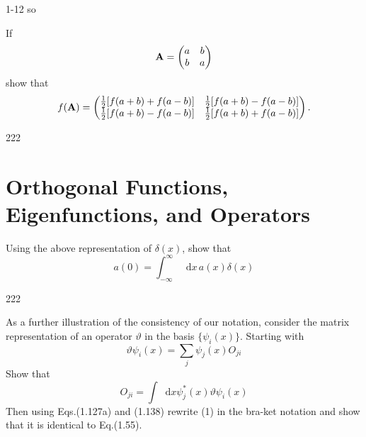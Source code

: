 \documentclass[a4paper]{book}
\newcommand*{\dif}{\mathop{}\!\mathrm{d}}
\newcommand{\A}{{\bf A}}
\begin{document}
	\begin{solution}
		1-12 so
	\end{solution}

	\begin{exercise}
	If
	\begin{equation*}
		\A = \begin{pmatrix} a & b \\ b & a \end{pmatrix}			
	\end{equation*}
	show that
	\begin{equation*}
		f(\A) = \begin{pmatrix}
		\frac{1}{2}[f(a+b)+f(a-b)] & \frac{1}{2}[f(a+b)-f(a-b)] \\
		\frac{1}{2}[f(a+b)-f(a-b)] & \frac{1}{2}[f(a+b)+f(a-b)]
		\end{pmatrix}.
	\end{equation*}
	\end{exercise}
	
	\begin{solution}
		222
	\end{solution}
	
	\section{Orthogonal Functions, Eigenfunctions, and Operators}
	
	\begin{exercise}
	Using the above representation of $\delta(x)$, show that
	\begin{equation*}
		a(0) = \int_{-\infty}^\infty \dif x \, a(x) \delta(x)
	\end{equation*}
	\end{exercise}
	
	\begin{solution}
		222
	\end{solution}

	\begin{exercise}
	As a further illustration of the consistency of our notation, consider the matrix representation of an operator $\vartheta$ in the basis $\{\psi_i(x)\}$. Starting with
	\begin{equation*}
		\vartheta \psi_i(x) = \sum_{j} \psi_j(x) O_{ji}
	\end{equation*}
	Show that
	\begin{equation}
		O_{ji} = \int \dif x \psi^*_j(x)\vartheta\psi_i(x)
	\end{equation}
	Then using Eqs.(1.127a) and (1.138) rewrite (1) in the bra-ket notation and show that it is identical to Eq.(1.55).
	\end{exercise}
	
\end{document}
